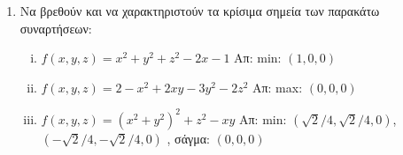 \begin{enumerate}

  \item Να βρεθούν και να χαρακτηριστούν τα κρίσιμα σημεία  των παρακάτω συναρτήσεων:
    \begin{enumerate}[i)]
      \item $ f(x,y,z) = x^{2}+y^{2}+ z^{2} -2x-1 $
        \hfill Απ: min: $ (1,0,0) $  
      \item $ f(x,y,z) = 2-x^{2}+2xy-3y^{2}-2z^{2} $ 
        \hfill Απ: max: $ (0,0,0) $ 
      \item $ f(x,y,z) = (x^{2}+y^{2})^{2}+z^{2}-xy $
        \hfill Απ: min: $ (\sqrt{2} /4, \sqrt{2} /4,0) $, $ (- \sqrt{2} /4, -
        \sqrt{2} /4, 0) $ , σάγμα: $ (0,0,0) $
    \end{enumerate}

\end{enumerate}

